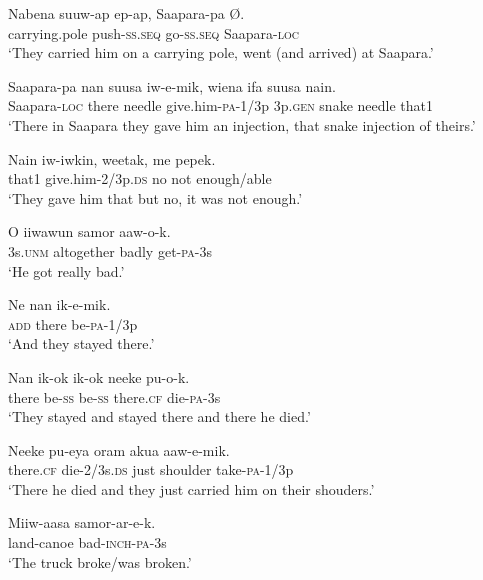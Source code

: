 \ea\label{ex:a:x33}
\gll  Nabena  suuw-ap  ep-ap,  Saapara-pa  Ø. \\
carrying.pole  push-\textsc{ss.seq}  go-\textsc{ss.seq}  Saapara-\textsc{loc} \\
\glt ‘They carried him on a carrying pole, went (and arrived) at Saapara.’ \\
\z


\ea\label{ex:a:x34}
\gll  Saapara-pa  nan  suusa  iw-e-mik,  wiena  ifa  suusa  nain. \\
Saapara-\textsc{loc}  there  needle  give.him-\textsc{pa}-1/3p  3p.\textsc{gen}  snake  needle  that1 \\
\glt ‘There in Saapara they gave him an injection, that snake injection of theirs.’ \\
\z


\ea\label{ex:a:x35}
\gll  Nain  iw-iwkin,  weetak,  me  pepek. \\
that1  give.him-2/3p.\textsc{ds}  no  not  enough/able \\
\glt ‘They gave him that but no, it was not enough.’ \\
\z


\ea\label{ex:a:x36}
\gll  O  iiwawun  samor  aaw-o-k. \\
3s.\textsc{unm}  altogether  badly  get-\textsc{pa}-3s \\
\glt ‘He got really bad.’ \\
\z


\ea\label{ex:a:x37}
\gll  Ne  nan  ik-e-mik. \\
\textsc{add}  there  be-\textsc{pa}-1/3p \\
\glt ‘And they stayed there.’ \\
\z


\ea\label{ex:a:x38}
\gll  Nan  ik-ok  ik-ok  neeke  pu-o-k. \\
there  be-\textsc{ss}  be-\textsc{ss}  there.\textsc{cf}  die-\textsc{pa}-3s \\
\glt ‘They stayed and stayed there and there he died.’ \\
\z


\ea\label{ex:a:x39}
\gll  Neeke  pu-eya  oram  akua  aaw-e-mik. \\
there.\textsc{cf}  die-2/3s.\textsc{ds}  just  shoulder  take-\textsc{pa}-1/3p \\
\glt ‘There he died and they just carried him on their shouders.’ \\
\z


\ea\label{ex:a:x40}
\gll  Miiw-aasa  samor-ar-e-k. \\
land-canoe  bad-\textsc{inch}-\textsc{pa}-3s \\
\glt ‘The truck broke/was broken.’ \\
\z


